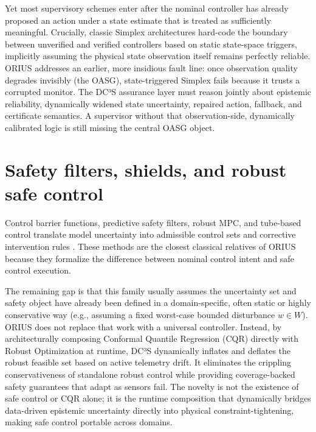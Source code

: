 Yet most supervisory schemes enter after the nominal controller has already proposed an
action under a state estimate that is treated as sufficiently meaningful. Crucially,
classic Simplex architectures hard-code the boundary between unverified and verified
controllers based on static state-space triggers, implicitly assuming the physical state
observation itself remains perfectly reliable. ORIUS addresses an earlier, more insidious
fault line: once observation quality degrades invisibly (the OASG), state-triggered
Simplex fails because it trusts a corrupted monitor. The DC³S assurance
layer must reason jointly about epistemic reliability, dynamically widened state
uncertainty, repaired action, fallback, and certificate semantics. A supervisor without
that observation-side, dynamically calibrated logic is still missing the central OASG
object.

\section{Safety filters, shields, and robust safe control}
Control barrier functions, predictive safety filters, robust MPC, and tube-based control
translate model uncertainty into admissible control sets and corrective intervention rules
\cite{ames2019control,ames2014cbf,wabersich2021predictive,nguyen2016exponential,wang2017safety,fisac2019general,mayne2005robust,langson2004tubes,rawlings2017mpc,ben2009robust,camacho2013model}.
These methods are the closest classical relatives of ORIUS because they formalize the
difference between nominal control intent and safe control execution.

The remaining gap is that this family usually assumes the uncertainty set and safety object
have already been defined in a domain-specific, often static or highly conservative way
(e.g., assuming a fixed worst-case bounded disturbance $w \in W$). ORIUS does not replace
that work with a universal controller. Instead, by architecturally composing Conformal
Quantile Regression (CQR) directly with Robust Optimization at runtime, DC³S dynamically
inflates and deflates the robust feasible set based on active telemetry drift. It
eliminates the crippling conservativeness of standalone robust control while providing
coverage-backed safety guarantees that adapt as sensors fail. The novelty is not the
existence of safe control or CQR alone; it is the runtime composition that dynamically
bridges data-driven epistemic uncertainty directly into physical constraint-tightening,
making safe control portable across domains.

